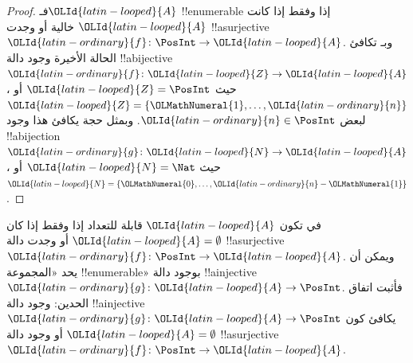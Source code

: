 \documentclass[../../../include/open-logic-section]{subfiles}
\begin{document}
\begin{proof}
فـ${\OLId{latin-looped}{A}}$ !!{enumerable} إذا وفقط إذا كانت ${\OLId{latin-looped}{A}}$ خالية أو وجدت
!!a{surjective} ${\OLId{latin-ordinary}{f}}\colon \PosInt \to {\OLId{latin-looped}{A}}$. وبـ
تكافئ الحالة الأخيرة وجود دالة !!a{bijective}~${\OLId{latin-ordinary}{f}}\colon {\OLId{latin-looped}{Z}} \to {\OLId{latin-looped}{A}}$،
حيث ${\OLId{latin-looped}{Z}} = \PosInt$ أو ${\OLId{latin-looped}{Z}} = \{{\OLMathNumeral{1}}, \dots, {\OLId{latin-ordinary}{n}}\}$ لبعض ${\OLId{latin-ordinary}{n}} \in \PosInt$.
وبمثل حجة  يكافئ هذا وجود
!!a{bijection} ${\OLId{latin-ordinary}{g}}\colon {\OLId{latin-looped}{N}} \to {\OLId{latin-looped}{A}}$، حيث ${\OLId{latin-looped}{N}} = \Nat$ أو ${\OLId{latin-looped}{N}} = \{{\OLMathNumeral{0}}, \dots, {\OLId{latin-ordinary}{n}}-{\OLMathNumeral{1}}\}$.
\end{proof}

\begin{prob}
في  تكون ${\OLId{latin-looped}{A}}$ قابلة للتعداد
إذا وفقط إذا كان ${\OLId{latin-looped}{A}} = \emptyset$ أو وجدت دالة !!a{surjective}
${\OLId{latin-ordinary}{f}}\colon \PosInt \to {\OLId{latin-looped}{A}}$. ويمكن أن يحد «المجموعة !!{enumerable}»
بوجود دالة !!a{injective} ${\OLId{latin-ordinary}{g}}\colon {\OLId{latin-looped}{A}} \to \PosInt$.
فأثبت اتفاق الحدين: وجود دالة !!a{injective} ${\OLId{latin-ordinary}{g}}\colon {\OLId{latin-looped}{A}} \to \PosInt$
يكافئ كون ${\OLId{latin-looped}{A}} = \emptyset$ أو وجود دالة !!a{surjective} ${\OLId{latin-ordinary}{f}}\colon \PosInt \to {\OLId{latin-looped}{A}}$.
\end{prob}
\end{document}
